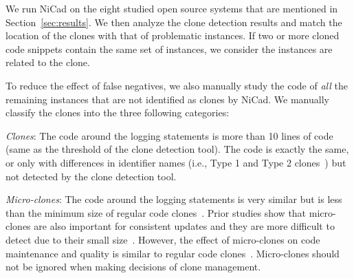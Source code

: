 We run NiCad on the eight studied open source systems that are mentioned in Section~\ref{sec:results}. We then analyze the clone detection results and match the location of the clones with that of problematic instances. If two or more cloned code snippets contain the same set of instances, we consider the instances are related to the clone. 

To reduce the effect of false negatives, we also manually study the code of {\em all} the remaining instances that are not identified as clones by NiCad. We manually classify the clones into the three following categories: %

{\em Clones}: The code around the logging statements is more than 10 lines of code (same as the threshold of the clone detection tool). The code is exactly the same, or only with differences in identifier names (i.e., Type 1 and Type 2 clones~\cite{CompareCloneDetectionTools2007}) but not detected by the clone detection tool.

{\em Micro-clones}: The code around the logging statements is very similar but is less than the minimum size of regular code clones~\cite{microclones}. Prior studies show that micro-clones are also important for consistent updates and they are more difficult to detect due to their small size~\cite{microclone4,microclone5,microclones}. However, the effect of micro-clones on code maintenance and quality is similar to regular code clones~\cite{MicroclonesAndBugsICPC, MicroclonesAndBugsSANER}. Micro-clones should not be ignored when making decisions of clone management.

